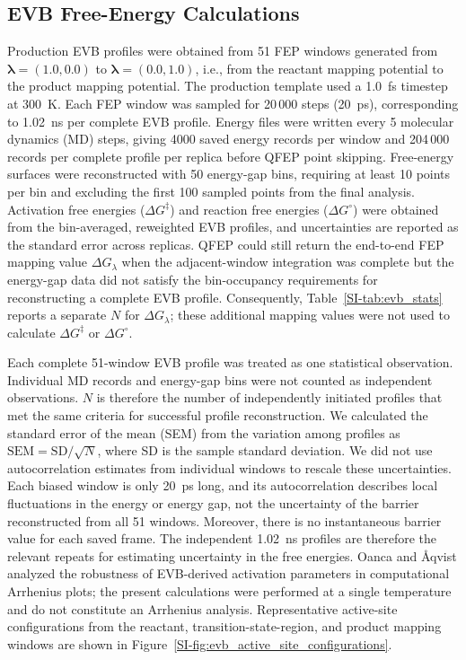 \subsection{EVB Free-Energy Calculations}

Production EVB profiles were obtained from 51 FEP windows generated from $\boldsymbol{\lambda}=(1.0,0.0)$ to $\boldsymbol{\lambda}=(0.0,1.0)$, i.e., from the reactant mapping potential to the product mapping potential. The production template used a 1.0~fs timestep at 300~K. Each FEP window was sampled for 20\,000 steps (20~ps), corresponding to 1.02~ns per complete EVB profile. Energy files were written every 5 molecular dynamics (MD) steps, giving 4000 saved energy records per window and 204\,000 records per complete profile per replica before QFEP point skipping. Free-energy surfaces were reconstructed with 50 energy-gap bins, requiring at least 10 points per bin and excluding the first 100 sampled points from the final analysis. Activation free energies ($\Delta G^{\ddagger}$) and reaction free energies ($\Delta G^{\circ}$) were obtained from the bin-averaged, reweighted EVB profiles, and uncertainties are reported as the standard error across replicas. QFEP could still return the end-to-end FEP mapping value $\Delta G_{\lambda}$ when the adjacent-window integration was complete but the energy-gap data did not satisfy the bin-occupancy requirements for reconstructing a complete EVB profile. Consequently, Table~\ref{SI-tab:evb_stats} reports a separate $N$ for $\Delta G_{\lambda}$; these additional mapping values were not used to calculate $\Delta G^{\ddagger}$ or $\Delta G^{\circ}$.

Each complete 51-window EVB profile was treated as one statistical observation. Individual MD records and energy-gap bins were not counted as independent observations. $N$ is therefore the number of independently initiated profiles that met the same criteria for successful profile reconstruction. We calculated the standard error of the mean (SEM) from the variation among profiles as $\mathrm{SEM}=\mathrm{SD}/\sqrt{N}$, where SD is the sample standard deviation. We did not use autocorrelation estimates from individual windows to rescale these uncertainties. Each biased window is only 20~ps long, and its autocorrelation describes local fluctuations in the energy or energy gap, not the uncertainty of the barrier reconstructed from all 51 windows. Moreover, there is no instantaneous barrier value for each saved frame. The independent 1.02~ns profiles are therefore the relevant repeats for estimating uncertainty in the free energies. Oanca and \AA{}qvist analyzed the robustness of EVB-derived activation parameters in computational Arrhenius plots; the present calculations were performed at a single temperature and do not constitute an Arrhenius analysis.\cite{oanca_arrhenius_2024}
Representative active-site configurations from the reactant, transition-state-region, and product mapping windows are shown in Figure~\ref{SI-fig:evb_active_site_configurations}.

